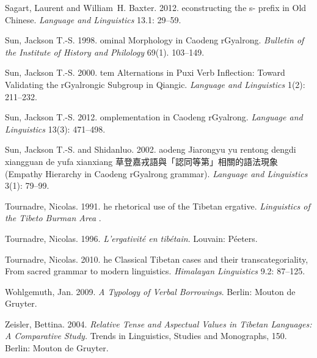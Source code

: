 \documentclass[oneside,a4paper,11pt]{article}
\newcommand{\zh}[1]{{\cn #1}}
\begin{document}
\begin{thebibliography}{39}
Sagart, Laurent and William~H. Baxter. 2012.
econstructing the s- prefix in {O}ld {C}hinese.
\newblock \emph{Language and Linguistics} 13.1: 29--59.

Sun, Jackson T.-S. 1998.
ominal {M}orphology in {C}aodeng r{G}yalrong.
\newblock \emph{Bulletin of the Institute of History and Philology} 69(1).
  103--149.

Sun, Jackson T.-S. 2000.
tem {A}lternations in {P}uxi {V}erb {I}nflection: {T}oward
  {V}alidating the r{G}yalrongic {S}ubgroup in {Q}iangic.
\newblock \emph{Language and Linguistics} 1(2): 211--232.

Sun, Jackson T.-S. 2012.
omplementation in {C}aodeng r{G}yalrong.
\newblock \emph{Language and Linguistics} 13(3): 471--498.

Sun, Jackson T.-S. and Shidanluo. 2002.
aodeng {J}iarongyu yu rentong dengdi xiangguan de yufa xianxiang
  \zh{草登嘉戎語與「認同等第」相關的語法現象} ({E}mpathy
  {H}ierarchy in {C}aodeng r{G}yalrong grammar).
\newblock \emph{Language and Linguistics} 3(1): 79--99.

Tournadre, Nicolas. 1991.
he rhetorical use of the {T}ibetan ergative.
\newblock \emph{Linguistics of the Tibeto Burman Area} .

Tournadre, Nicolas. 1996.
\newblock \emph{{L}'ergativité en tibétain}.
\newblock Louvain: Péeters.

Tournadre, Nicolas. 2010.
he {C}lassical {T}ibetan cases and their transcategoriality,
  {F}rom sacred grammar to modern linguistics.
\newblock \emph{Himalayan Linguistics} 9.2: 87--125.

Wohlgemuth, Jan. 2009.
\newblock \emph{{A} {T}ypology of {V}erbal {B}orrowings}.
\newblock Berlin: Mouton de Gruyter.

Zeisler, Bettina. 2004.
\newblock \emph{{R}elative {T}ense and {A}spectual {V}alues in {T}ibetan
  {L}anguages: {A} {C}omparative {S}tudy.} Trends in Linguistics, Studies and
  Monographs, 150.
\newblock Berlin: Mouton de Gruyter.

\end{thebibliography}
\end{document}
